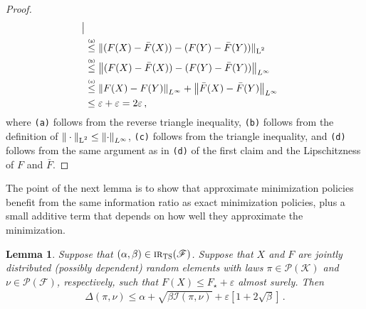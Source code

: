 \documentclass[letter, 12pt]{report}
\newcommand{\explan}[1]{\stackrel{\text{\tiny \texttt{#1}}}}
\newcommand{\norm}[1]{\left \Vert  #1 \right \Vert}
\newcommand{\Lsnorm}[1]{ \Vert  #1 \Vert_{\text{\scriptsize \textrm{L}$^2$}}}
\newcommand{\cK}{\mathcal K}
\newcommand{\sF}{\mathscr F}
\newcommand{\cI}{\mathcal I}
\newcommand{\sP}{\mathscr P}
\newcommand{\1}{\mathbf{1}}
\newcommand{\IR}{\operatorname{\textsc{ir}}}
\newcommand{\ts}{\textsc{TS}\xspace}
\renewcommand{\epsilon}{\varepsilon}
\theoremstyle{plain}
\newtheorem{lemma}[theorem]{Lemma}
\theoremstyle{definition}
\theoremstyle{remark}
\begin{document}
\begin{proof}
\begin{align*}
        \big|
        \\
         &
        \explan{(a)}
        \leq
        \Lsnorm{(F(X) - \bar{F}(X)) - (F(Y) - \bar{F}(Y))}                        \\
         &
        \explan{(b)}
        \leq
        \norm{(F(X) - \bar{F}(X)) - (F(Y) - \bar{F}(Y))}_{L^\infty}               \\
         &
        \explan{(c)}
        \leq
        \norm{F(X) - F(Y)}_{L^\infty} + \norm{\bar{F}(X) - \bar{F}(Y)}_{L^\infty} \\
         & \leq
        \epsilon + \epsilon
        = 2\epsilon \,,
    \end{align*}
    where \texttt{(a)} follows from the reverse triangle inequality,
    \texttt{(b)} follows from the definition of $\Lsnorm{\cdot} \leq \norm{\cdot}_{L^\infty}$,
    \texttt{(c)} follows from the triangle inequality, and
    \texttt{(d)}
    follows from the same argument as in \texttt{(d)} of the first claim and the Lipschitzness of $F$ and $\bar F$.
\end{proof}

The point of the next lemma is to show that approximate minimization policies benefit from the same information ratio as exact minimization policies, plus a small additive term that depends on how well they approximate the minimization.
\begin{lemma}\label{lem:ts-eps}
    Suppose that $(\alpha, \beta) \in \IR_\ts(\sF)$.
    Suppose that $X$ and $F$ are jointly distributed (possibly dependent) random elements with laws $\pi \in \sP(\cK)$ and $\nu \in \sP(\sF)$, respectively, such that
    $F(X) \leq F_\star + \epsilon$ almost surely. Then
    \begin{align*}
        \Delta(\pi, \nu) \leq \alpha + \sqrt{\beta \cI(\pi, \nu)} + \epsilon\left[1 + 2\sqrt{\beta}\right]\,.
    \end{align*}
\end{lemma}
\end{document}
